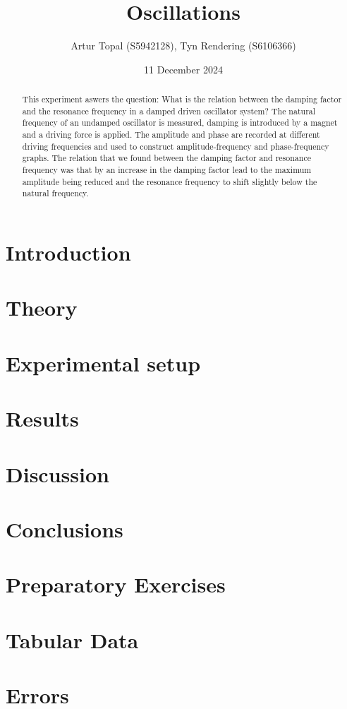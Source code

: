 \documentclass[a4paper,12pt]{article}
\title{Oscillations}
\author{Artur Topal (S5942128), Tyn Rendering (S6106366)}
\date{11 December 2024}
\begin{document}
\maketitle

\begin{abstract}
This experiment aswers the question: What is the relation between the damping factor and the resonance frequency in a damped driven oscillator system? The natural frequency of an undamped oscillator is measured, damping is introduced by a magnet and a driving force is applied. The amplitude and phase are recorded at different driving frequencies and used to construct amplitude-frequency and phase-frequency graphs. The relation that we found between the damping factor and resonance frequency was that by an increase in the damping factor lead to the maximum amplitude being reduced and the resonance frequency to shift slightly below the natural frequency.
\end{abstract}

\break
\tableofcontents
\break
\section{Introduction}


\section{Theory} \label{sec:theory}


\section{Experimental setup}


\section{Results}


\section{Discussion}


\section{Conclusions}


\appendix
\section{Preparatory Exercises} \label{appendix:preps}

 
\section{Tabular Data} \label{appendix:data}


\section{Errors} \label{appendix:errors}

\end{document}

